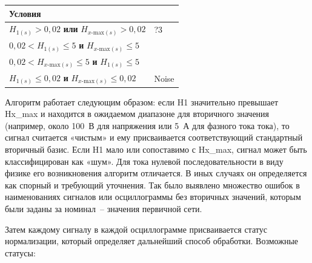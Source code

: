 \mbox{}\par\vspace{0.2cm}
{\small
\centering
\renewcommand{\arraystretch}{1.3}
\noindent
\begin{tabular}{|>{\centering\arraybackslash}p{340pt}|>{\centering\arraybackslash}p{80pt}|}
\hline
Условия &
\\ \hline
$H_{1(s)} > 0{,}02$ \textbf{или} $H_{x\text{-max}(s)} > 0{,}02$ &
?3 \\ \hline
$0{,}02 < H_{1(s)} \le 5$ \textbf{и} $H_{x\text{-max}(s)} \le 5$ &
\multirow{2}{*}{$IN_{\text{base}} = 1$} \\ \cline{1-1}
$0{,}02 < H_{x\text{-max}(s)} \le 5$ \textbf{и} $H_{1(s)} \le 5$ &
\\ \hline
$H_{1(s)} \le 0{,}02$ \textbf{и} $H_{x\text{-max}(s)} \le 0{,}02$ &
Noise \\ \hline
\end{tabular}
\par}
\vspace{0.3cm}


Алгоритм работает следующим образом: если H1 значительно превышает Hx\_max и находится в ожидаемом диапазоне для вторичного значения (например, около 100~В для напряжения или 5~А для фазного тока тока), то сигнал считается «чистым» и ему присваивается соответствующий стандартный вторичный базис. Если H1 мало или сопоставимо с Hx\_max, сигнал может быть классифицирован как «шум». Для тока нулевой последовательности в виду физике его возникновения алгоритм отличается. В иных случаях он определяется как спорный и требующий уточнения. Так было выявлено множество ошибок в наименованиях сигналов или осциллограммы без вторичных значений, которым были заданы за номинал~-- значения первичной сети.

Затем каждому сигналу в каждой осциллограмме присваивается статус нормализации, который определяет дальнейший способ обработки. Возможные статусы:

